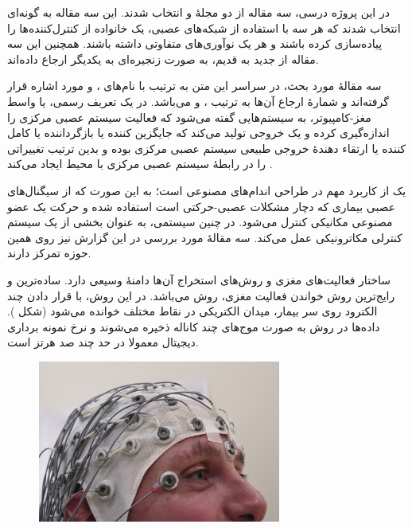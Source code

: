 در این پروژه درسی، سه مقاله از دو مجلهٔ  و  انتخاب شدند. این سه مقاله به گونه‌ای انتخاب شدند که هر سه با استفاده از شبکه‌های عصبی، یک خانواده از کنترل‌کننده‌ها را پیاده‌سازی کرده باشند و هر یک نوآوری‌های متفاوتی داشته باشند. همچنین این سه مقاله از جدید به قدیم، به صورت زنجیره‌ای به یکدیگر ارجاع داده‌اند.

سه مقالهٔ مورد بحث، در سراسر این متن به ترتیب با نام‌های \آ، \ب و \پ مورد اشاره قرار گرفته‌اند و شمارهٔ ارجاع آن‌ها به ترتیب ،  و  می‌باشد.
در یک تعریف رسمی،  یا واسط مغز-کامپیوتر، به سیستم‌هایی گفته می‌شود که فعالیت سیستم عصبی مرکزی را اندازه‌گیری کرده و یک خروجی تولید می‌کند که جایگزین کننده یا بازگرداننده یا کامل کننده یا ارتقاء دهندهٔ خروجی طبیعی سیستم عصبی مرکزی بوده و بدین ترتیب تغییراتی را در رابطهٔ سیستم عصبی مرکزی با محیط ایجاد می‌کند .

یک از کاربرد مهم  در طراحی اندام‌های مصنوعی است؛ به این صورت که از سیگنال‌های عصبی بیماری که دچار مشکلات عصبی-حرکتی است استفاده شده و حرکت یک عضو مصنوعی مکانیکی کنترل می‌شود. در چنین سیستمی،  به عنوان بخشی از یک سیستم کنترلی مکاترونیکی عمل می‌کند. سه مقالهٔ مورد بررسی در این گزارش نیز روی همین حوزه تمرکز دارند.

ساختار فعالیت‌های مغزی و روش‌های استخراج آن‌ها دامنهٔ وسیعی دارد. ساده‌ترین و رایج‌ترین روش خواندن فعالیت مغزی، روش  می‌باشد. در این روش، با قرار دادن چند الکترود روی سر بیمار، میدان الکتریکی در نقاط مختلف خوانده می‌شود (شکل ). داده‌ها در روش  به صورت موج‌های چند کاناله ذخیره می‌شوند و نرخ نمونه برداری دیجیتال معمولا در حد چند صد هرتز است.

\begin{figure}
\centering
\includegraphics[width=8cm]{img/electrodes.jpg}
\end{figure}

